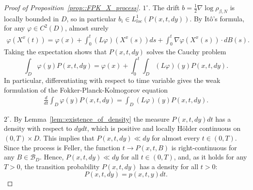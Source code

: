 \documentclass[11pt]{article}
\numberwithin{equation}{section}
\theoremstyle{definition}
\begin{document}
\begin{proof}[Proof of Proposition~\ref{prop::FPK_X_process}]
$1^{\circ}.$ The drift $b = \frac{1}{2}\nabla\log\rho_{\beta,N}$ is locally bounded in $D$, so in particular $b_{i}\in L^{1}_{loc}(P(x,t,dy))$. By Itô's formula, for any $\varphi\in C^{2}({D})$, almost surely
\begin{align*}
    \varphi(X^{x}(t))
    = \varphi(x) + \int_{0}^{t}(L\varphi)(X^{x}(s))ds + \int_{0}^{t}\nabla\varphi (X^{x}(s))\cdot dB(s).
\end{align*}
Taking the expectation shows that $P(x,t,dy)$ solves the Cauchy problem 
\[
    \int_{D}\varphi(y)P(x,t,dy)  = \varphi(x) + \int_{0}^{t}\int_{D}(L\varphi)(y)P(x,t,dy).
\]
In particular,  differentiating with respect to time variable gives the weak formulation of the Fokker-Planck-Kolmogorov equation
\begin{align*}
    \frac{d}{dt}\int_{D}\varphi(y)P(x,t,dy) = \int_{D}(L\varphi)(y)P(x,t,dy).
\end{align*}

$2^{\circ}.$ By Lemma~\ref{lem::existence_of_density} the measure $P(x,t,dy)dt$ has a density with respect to $dydt$, which is positive and locally Hölder continuous on $(0,T)\times D$. This implies that $P(x,t,dy)\ll dy$ for almost every $t\in (0,T)$. Since the process is Feller,  the function $t\to P(x,t,B)$ is right-continuous for any $B\in\mathcal{B}_{D}$. Hence, $P(x,t,dy) \ll dy$ for all $t\in (0,T)$, and, as it holds for any $T>0$, the transition probability $P(x,t,dy)$ has a density for all $t>0$:
\[
    P(x,t,dy) = p(x,t,y)dt.
\]


\end{proof}
\end{document}
